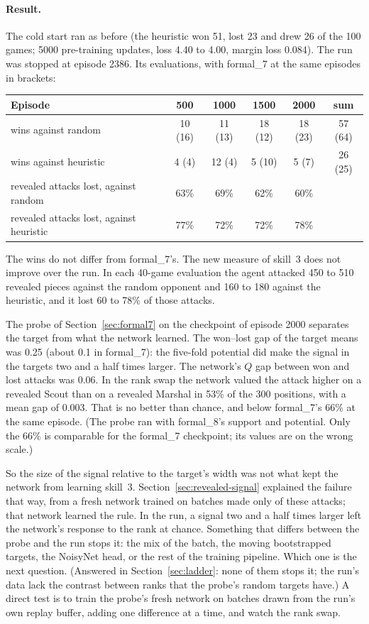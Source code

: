 \paragraph{Result.} The cold start ran as before (the heuristic won 51, lost 23 and drew 26 of
the 100 games; 5000 pre-training updates, loss 4.40 to 4.00, margin loss 0.084). The run was
stopped at episode 2386. Its evaluations, with formal\_7 at the same episodes in brackets:
\begin{center}
\small
\begin{tabular}{lccccc}
\toprule
Episode & 500 & 1000 & 1500 & 2000 & sum \\
\midrule
wins against random    & 10 (16) & 11 (13) & 18 (12) & 18 (23) & 57 (64) \\
wins against heuristic & 4 (4)   & 12 (4)  & 5 (10)  & 5 (7)   & 26 (25) \\
revealed attacks lost, against random    & 63\% & 69\% & 62\% & 60\% & \\
revealed attacks lost, against heuristic & 77\% & 72\% & 72\% & 78\% & \\
\bottomrule
\end{tabular}
\end{center}
The wins do not differ from formal\_7's. The new measure of skill~3 does not improve over the
run. In each 40-game evaluation the agent attacked 450 to 510 revealed pieces against the random
opponent and 160 to 180 against the heuristic, and it lost 60 to 78\% of those attacks.

The probe of Section~\ref{sec:formal7} on the checkpoint of episode 2000 separates the target from
what the network learned. The won--lost gap of the target means was 0.25 (about 0.1 in formal\_7):
the five-fold potential did make the signal in the targets two and a half times larger. The
network's $Q$ gap between won and lost attacks was 0.06. In the rank swap the network valued
the attack higher on a revealed Scout than on a revealed Marshal in 53\% of the 300 positions,
with a mean gap of 0.003. That is no better than chance, and below formal\_7's 66\% at the same
episode. (The probe ran with formal\_8's support and potential. Only the 66\% is comparable for the
formal\_7 checkpoint; its values are on the wrong scale.)

So the size of the signal relative to the target's width was not what kept the network from
learning skill~3. Section~\ref{sec:revealed-signal} explained the failure that way, from a fresh
network trained on batches made only of these attacks; that network learned the rule. In the
run, a signal two and a half times larger left the network's response to the rank at chance.
Something that differs between the probe and the run stops it: the mix of the batch, the moving
bootstrapped targets, the NoisyNet head, or the rest of the training pipeline. Which one is the
next question. (Answered in Section~\ref{sec:ladder}: none of them stops it; the run's data lack the
contrast between ranks that the probe's random targets have.) A direct test is to train the probe's fresh network on batches drawn from the
run's own replay buffer, adding one difference at a time, and watch the rank swap.

